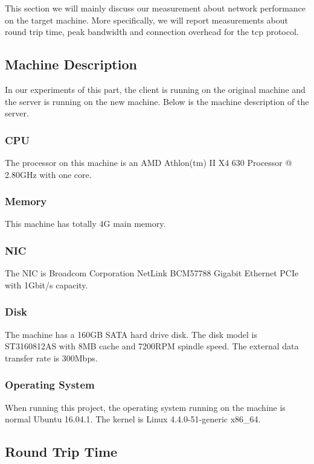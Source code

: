 
% 

This section we will mainly discuss our measurement about network performance on the target machine. More specifically, we will report measurements about round trip time, peak bandwidth and connection overhead for the tcp protocol.

\subsection{Machine Description}
\label{Network_machine_desc}
In our experiments of this part, the client is running on the original machine and the server is running on the new machine. Below is the machine description of the server.

\subsubsection{CPU}

The processor on this machine is an AMD Athlon(tm) II X4 630 Processor @ 2.80GHz with one core.

\subsubsection{Memory}

This machine has totally 4G main memory.

\subsubsection{NIC}

The NIC is Broadcom Corporation NetLink BCM57788 Gigabit Ethernet PCIe with 1Gbit/s capacity.

\subsubsection{Disk}
The machine has a 160GB SATA hard drive disk. The disk model is ST3160812AS with 8MB cache and 7200RPM spindle speed. The external data transfer rate is 300Mbps.

\subsubsection{Operating System}
When running this project, the operating system running on the machine is normal Ubuntu 16.04.1. The kernel is Linux 4.4.0-51-generic x86\_64.

\subsection{Round Trip Time}


